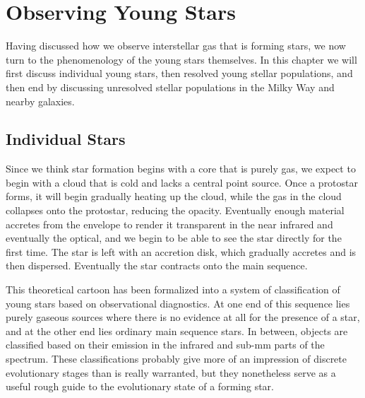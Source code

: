 \chapter{Observing Young Stars}
\label{ch:obsstars}


Having discussed how we observe interstellar gas that is forming stars, we now turn to the phenomenology of the young stars themselves. In this chapter we will first discuss individual young stars, then resolved young stellar populations, and then end by discussing unresolved stellar populations in the Milky Way and nearby galaxies.

\section{Individual Stars}

Since we think star formation begins with a core that is purely gas, we expect to begin with a cloud that is cold and lacks a central point source. Once a protostar forms, it will begin gradually heating up the cloud, while the gas in the cloud collapses onto the protostar, reducing the opacity. Eventually enough material accretes from the envelope to render it transparent in the near infrared and eventually the optical, and we begin to be able to see the star directly for the first time. The star is left with an accretion disk, which gradually accretes and is then dispersed. Eventually the star contracts onto the main sequence.

This theoretical cartoon has been formalized into a system of classification of young stars based on observational diagnostics. At one end of this sequence lies purely gaseous sources where there is no evidence at all for the presence of a star, and at the other end lies ordinary main sequence stars. In between, objects are classified based on their emission in the infrared and sub-mm parts of the spectrum. These classifications probably give more of an impression of discrete evolutionary stages than is really warranted, but they nonetheless serve as a useful rough guide to the evolutionary state of a forming star.

